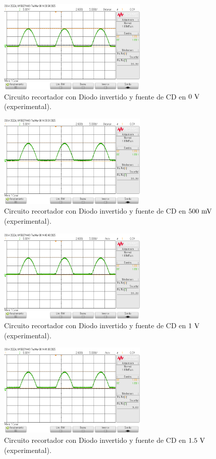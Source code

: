 \documentclass[journal]{IEEEtran}
\begin{document}
\begin{figure}[H]
        \centering
        \includegraphics[width=2.8in]{SignalExperimental_11.png}
        \caption{Circuito recortador con Diodo invertido y fuente de CD en $0~\textnormal{V}$ (experimental).}
        \label{fig:SignalExperimental_11}
\end{figure}
\begin{figure}[H]
        \centering
        \includegraphics[width=2.8in]{SignalExperimental_12.png}
        \caption{Circuito recortador con Diodo invertido y fuente de CD en $500~\textnormal{mV}$ (experimental).}
        \label{fig:SignalExperimental_12}
\end{figure}
\begin{figure}[H]
        \centering
        \includegraphics[width=2.8in]{SignalExperimental_13.png}
        \caption{Circuito recortador con Diodo invertido y fuente de CD en $1~\textnormal{V}$ (experimental).}
        \label{fig:SignalExperimental_13}
\end{figure}
\begin{figure}[H]
        \centering
        \includegraphics[width=2.8in]{SignalExperimental_14.png}
        \caption{Circuito recortador con Diodo invertido y fuente de CD en $1.5~\textnormal{V}$ (experimental).}
        \label{fig:SignalExperimental_14}
\end{figure}
\end{document}

